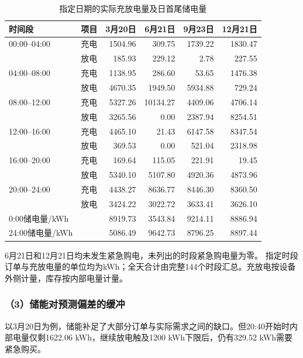 \begin{table}[!htbp]
\centering
\caption{指定日期的实际充放电量及日首尾储电量}
\label{tab:q2_storage}
\begin{tabular}{llrrrr}
\hline
时间段 & 项目 & 3月20日 & 6月21日 & 9月23日 & 12月21日 \\
\hline
00:00--04:00 & 充电
& 1504.96 & 309.75 & 1739.22 & 1830.47 \\
& 放电
& 185.93 & 229.12 & 2.78 & 227.55 \\

04:00--08:00 & 充电
& 1138.95 & 286.60 & 53.65 & 1476.38 \\
& 放电
& 4670.35 & 1949.50 & 5934.88 & 729.24 \\

08:00--12:00 & 充电
& 5327.26 & 10134.27 & 4409.06 & 4706.14 \\
& 放电
& 3265.56 & 0.00 & 2387.94 & 8254.51 \\

12:00--16:00 & 充电
& 4465.10 & 21.43 & 6147.58 & 8347.54 \\
& 放电
& 369.53 & 0.00 & 521.04 & 2318.98 \\

16:00--20:00 & 充电
& 169.64 & 115.05 & 221.91 & 19.45 \\
& 放电
& 5340.10 & 5107.80 & 4920.36 & 4873.96 \\

20:00--24:00 & 充电
& 4438.27 & 8636.77 & 8446.30 & 8360.50 \\
& 放电
& 3424.22 & 3022.72 & 3633.41 & 3626.10 \\
\hline
0:00储电量/kWh & 
& 8919.73 & 3543.84 & 9214.11 & 8886.94 \\
24:00储电量/kWh &
& 5086.49 & 9642.73 & 8796.25 & 8897.44 \\
\hline
\end{tabular}
\end{table}

6月21日和12月21日均未发生紧急购电，未列出的时段紧急购电量为零。
指定时段订单与充放电量的单位均为kWh；全天合计由完整144个时段汇总。充放电按设备外侧计量，库存按内部电量计量。

\subsubsection*{（3）储能对预测偏差的缓冲}

以3月20日为例，储能补足了大部分订单与实际需求之间的缺口。但20:40开始时内部电量仅剩1622.06 kWh，继续放电触及1200 kWh下限后，仍有329.52 kWh需要紧急购买。

